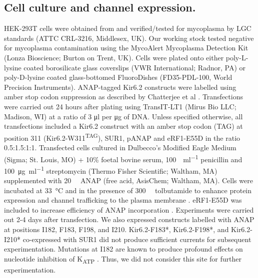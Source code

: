 \documentclass[10pt,lineno, doublespacing]{elife}
\begin{document}
\subsection{Cell culture and channel expression.}
HEK-293T cells were obtained from and verified/tested for mycoplasma by LGC standards (ATTC CRL-3216, Middlesex, UK).
Our working stock tested negative for mycoplasma contamination using the MycoAlert Mycoplasma Detection Kit (Lonza Bioscience; Burton on Trent, UK).
Cells were plated onto either poly-L-lysine coated borosilicate glass coverslips (VWR International; Radnor, PA) or poly-D-lysine coated glass-bottomed FluoroDishes (FD35-PDL-100, World Precision Instruments).
ANAP-tagged Kir6.2 constructs were labelled using amber stop codon suppression as described by Chatterjee et al \citep{RN17}.
Transfections were carried out 24 hours after plating using TransIT-LT1 (Mirus Bio LLC; Madison, WI) at a ratio of 3 \si{\micro\litre} per \si{\micro\gram} of DNA.
Unless specified otherwise, all transfections included a Kir6.2 construct with an amber stop codon (TAG) at position 311 (Kir6.2-W311\textsuperscript{TAG}), SUR1, pANAP and eRF1-E55D in the ratio 0.5:1.5:1:1.
Transfected cells cultured in Dulbecco’s Modified Eagle Medium (Sigma; St. Louis, MO) + 10\% foetal bovine serum, \SI{100}{\Unit\per\milli\litre} penicillin and \SI{100}{\micro\gram\per\milli\litre} streptomycin (Thermo Fisher Scientific; Waltham, MA) supplemented with \SI{20}{\milli\Molar} ANAP (free acid, AsisChem; Waltham, MA).
Cells were incubated at \SI{33}{\degreeCelsius} and in the presence of \SI{300}{\micro\Molar} tolbutamide to enhance protein expression and channel trafficking to the plasma membrane \citep{RN106, RN49}.
eRF1-E55D was included to increase efficiency of ANAP incorporation \citep{RN42}.
Experiments were carried out 2-4 days after transfection.
We also expressed constructs labelled with ANAP at positions I182, F183, F198, and I210.
Kir6.2-F183*, Kir6.2-F198*, and Kir6.2-I210* co-expressed with SUR1 did not produce sufficient currents for subsequent experimentation.
Mutations at I182 are known to produce profound effects on nucleotide inhibition of K\textsubscript{ATP} \citep{RN107}.
Thus, we did not consider this site for further experimentation.
\end{document}
